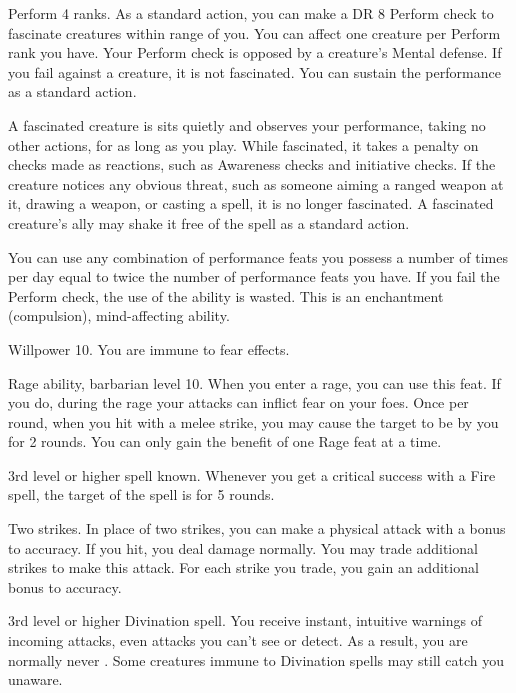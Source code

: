 \featpre Perform 4 ranks.
\featben As a standard action, you can make a DR 8 Perform check to fascinate creatures within \rngmed range of you.
You can affect one creature per Perform rank you have.
Your Perform check is opposed by a creature's Mental defense.
If you fail against a creature, it is not fascinated.
You can sustain the performance as a standard action.

A fascinated creature is sits quietly and observes your performance, taking no other actions, for as long as you play.
While fascinated, it takes a  penalty on checks made as reactions, such as Awareness checks and initiative checks.
If the creature notices any obvious threat, such as someone aiming a ranged weapon at it, drawing a weapon, or casting a spell, it is no longer fascinated.
A fascinated creature's ally may shake it free of the spell as a standard action.

You can use any combination of performance feats you possess a number of times per day equal to twice the number of performance feats you have.
If you fail the Perform check, the use of the ability is wasted.
This is an enchantment (compulsion), mind-affecting ability.

\featpre Willpower 10.
\featben You are immune to fear effects.

\featpre Rage ability, barbarian level 10.
\featben When you enter a rage, you can use this feat. If you do, during the rage your attacks can inflict fear on your foes.
Once per round, when you hit with a melee strike, you may cause the target to be \shaken by you for 2 rounds.
 You can only gain the benefit of one Rage feat at a time.

\featpre 3rd level or higher  spell known.
\featben Whenever you get a critical success with a Fire spell, the target of the spell is \ignited for 5 rounds.

\featpre Two strikes.
\featben In place of two strikes, you can make a physical attack with a  bonus to accuracy.
If you hit, you deal damage normally.
You may trade additional strikes to make this attack.
For each strike you trade, you gain an additional  bonus to accuracy.

\featpre 3rd level or higher Divination spell.
\featben You receive instant, intuitive warnings of incoming attacks, even attacks you can't see or detect.
As a result, you are normally never \unaware.
Some creatures immune to Divination spells may still catch you unaware.

